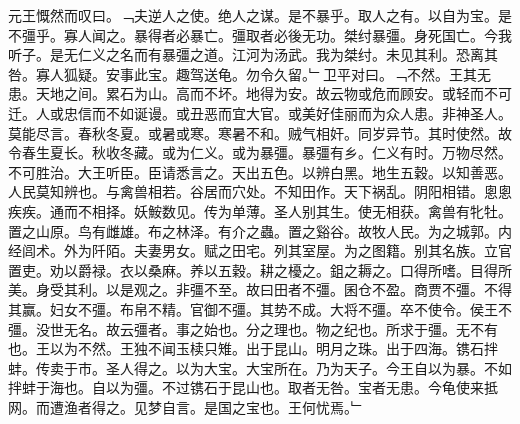 \documentclass{zhvt-classic}
\begin{document}
\hspace*{2em}元王慨然而叹曰。﹁夫逆人之使。绝人之谋。是不暴乎。取人之有。以自为宝。是不彊乎。寡人闻之。暴得者必暴亡。彊取者必後无功。桀纣暴彊。身死国亡。今我听子。是无仁义之名而有暴彊之道。江河为汤武。我为桀纣。未见其利。恐离其咎。寡人狐疑。安事此宝。趣驾送龟。勿令久留。﹂卫平对曰。﹁不然。王其无患。天地之间。累石为山。高而不坏。地得为安。故云物或危而顾安。或轻而不可迁。人或忠信而不如诞谩。或丑恶而宜大官。或美好佳丽而为众人患。非神圣人。莫能尽言。春秋冬夏。或暑或寒。寒暑不和。贼气相奸。同岁异节。其时使然。故令春生夏长。秋收冬藏。或为仁义。或为暴彊。暴彊有乡。仁义有时。万物尽然。不可胜治。大王听臣。臣请悉言之。天出五色。以辨白黑。地生五穀。以知善恶。人民莫知辨也。与禽兽相若。谷居而穴处。不知田作。天下祸乱。阴阳相错。悤悤疾疾。通而不相择。妖鮟数见。传为单薄。圣人别其生。使无相获。禽兽有牝牡。置之山原。鸟有雌雄。布之林泽。有介之蟲。置之谿谷。故牧人民。为之城郭。内经闾术。外为阡陌。夫妻男女。赋之田宅。列其室屋。为之图籍。别其名族。立官置吏。劝以爵禄。衣以桑麻。养以五穀。耕之櫌之。鉏之耨之。口得所嗜。目得所美。身受其利。以是观之。非彊不至。故曰田者不彊。囷仓不盈。商贾不彊。不得其赢。妇女不彊。布帛不精。官御不彊。其势不成。大将不彊。卒不使令。侯王不彊。没世无名。故云彊者。事之始也。分之理也。物之纪也。所求于彊。无不有也。王以为不然。王独不闻玉椟只雉。出于昆山。明月之珠。出于四海。镌石拌蚌。传卖于市。圣人得之。以为大宝。大宝所在。乃为天子。今王自以为暴。不如拌蚌于海也。自以为彊。不过镌石于昆山也。取者无咎。宝者无患。今龟使来抵网。而遭渔者得之。见梦自言。是国之宝也。王何忧焉。﹂\\
\end{document}
